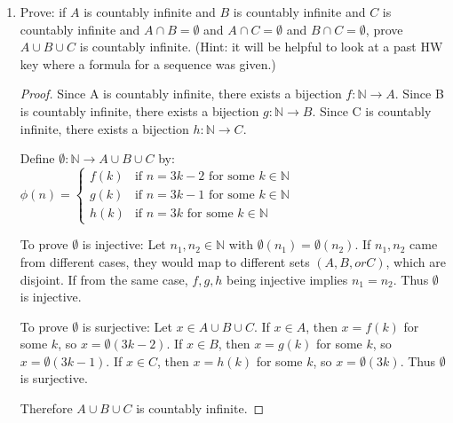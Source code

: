 \documentclass{article}
\begin{document}
\begin{enumerate}
\begin{proof}
              Since $f$ is both injective and surjective, it is bijective. Therefore $[2,6]$
              and $[11,20]$ are equicardinal.
          \end{proof}

    \item Prove: if $A$ is countably infinite and $B$ is countably infinite and $C$ is
          countably infinite and $A \cap B = \emptyset$ and $A \cap C= \emptyset$ and $B
              \cap C = \emptyset$, prove $A \cup B \cup C$ is countably infinite. (Hint: it
          will be helpful to look at a past HW key where a formula for a sequence was
          given.)

          \begin{proof}
              Since A is countably infinite, there exists a bijection $f: \mathbb{N} \rightarrow A$.
              Since B is countably infinite, there exists a bijection $g: \mathbb{N} \rightarrow B$.
              Since C is countably infinite, there exists a bijection $h: \mathbb{N} \rightarrow C$.

              Define $\emptyset: \mathbb{N} \rightarrow A \cup B \cup C$ by: $\phi(n) = \begin{cases}
                      f(k) & \text{if } n = 3k-2 \text{ for some } k \in \mathbb{N} \\
                      g(k) & \text{if } n = 3k-1 \text{ for some } k \in \mathbb{N} \\
                      h(k) & \text{if } n = 3k \text{ for some } k \in \mathbb{N}
                  \end{cases}$

              To prove $\emptyset$ is injective: Let $n_1, n_2 \in \mathbb{N}$ with
              $\emptyset(n_1) = \emptyset(n_2)$. If $n_1, n_2$ came from different cases,
              they would map to different sets $(A, B, or C)$, which are disjoint. If from
              the same case, $f, g, h$ being injective implies $n_1 = n_2$. Thus $\emptyset$
              is injective.

              To prove $\emptyset$ is surjective: Let $x \in A \cup B \cup C$. If $x \in A$,
              then $x = f(k)$ for some $k$, so $x = \emptyset(3k-2)$. If $x \in B$, then $x =
                  g(k)$ for some $k$, so $x = \emptyset(3k-1)$. If $x \in C$, then $x = h(k)$ for
              some $k$, so $x = \emptyset(3k)$. Thus $\emptyset$ is surjective.

              Therefore $A \cup B \cup C$ is countably infinite.
          \end{proof}

\end{enumerate}
\end{document}
